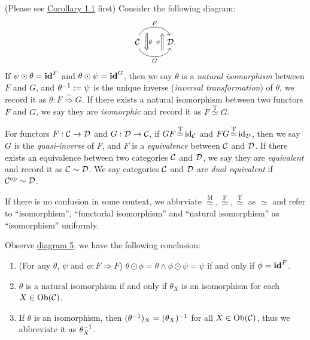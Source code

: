 \documentclass{article}
\begin{document}
\begin{defi}
	(Please see \hyperref[identity transformation]{Corollary 1.1} first) Consider the following diagram:
	\begin{equation}\begin{tikzcd}\label{iso}
		\ca 
		\arrow[r, bend left =75, "F", ""' {name=U1, near start}, ""' {name=U2, near end}]
		\arrow[r, bend right=75, "G"', "" {name=D1, near start}, ""  {name=D2, near end}]
		& \D.
		\arrow[Rightarrow, "\theta", from=U1, to=D1]
		\arrow[Rightarrow, "\psi"  , from=D2, to=U2]
    \end{tikzcd}\end{equation}
	If $\psi\odot\theta=\mathbf{id}^F$ and $\theta\odot\psi=\mathbf{id}^G$, then we say $\theta$ is a \emph{natural isomorphism} between $F$ and $G$, and $\theta^{-1}:=\psi$ is the unique inverse (\emph{inversal transformation}) of $\theta$, we record it as $\theta:F\mathop{\Rightarrow}\limits^{\sim}G$. If there exists a natural isomorphism between two functors $F$ and $G$, we say they are \emph{isomorphic} and record it as $F\mathop{\simeq}\limits^\mathrm{T}G$.
	
	For functors $F:\mathcal{C}\to\mathcal{D}$ and $G:\mathcal{D}\to\mathcal{C}$, if $GF\mathop{\simeq}\limits^\mathrm{T}\mathrm{id}_{\mathcal{C}}$ and $FG\mathop{\simeq}\limits^\mathrm{T}\mathrm{id}_{\mathcal{D}}$, then we say $G$ is the \emph{quasi-inverse} of $F$, and $F$ is a \emph{equivalence} between $\mathcal{C}$ and $\mathcal{D}$. If there exists an equivalence between two categories $\mathcal{C}$ and $\mathcal{D}$, we say they are \emph{equivalent} and record it as $\mathcal{C}\sim\mathcal{D}$. We say categories $\mathcal{C}$ and $\mathcal{D}$ are \emph{dual equivalent} if $\mathcal{C}^\mathrm{op}\sim\mathcal{D}$.
	
	If there is no confusion in some context, we abbrviate $\mathop{\simeq}\limits^\mathrm{M},\mathop{\simeq}\limits^\mathrm{F},\mathop{\simeq}\limits^\mathrm{T}$ as $\simeq$ and refer to ``isomorphism'', ``functorial isomorphism'' and ``natural isomorphism'' as ``isomorphism'' uniformly.
\end{defi}


\begin{cor}\label{identity transformation}
	Observe \hyperref[iso]{diagram 5}, we have the following conclusion:
	\begin{enumerate}
		\item (For any $\theta$, $\psi$ and $\phi:F\Rightarrow F$) $\theta\odot\phi=\theta\wedge\phi\odot\psi=\psi$ if and only if $\phi=\mathbf{id}^F$.
		\item $\theta$ is a natural isomorphism if and only if $\theta_X$ is an isomorphism for each $X\in\mathrm{Ob}(\mathcal{C})$.
		\item If $\theta$ is an isomorphism, then $(\theta^{-1})_X=(\theta_X)^{-1}$ for all $X\in\mathrm{Ob}(\mathcal{C})$, thus we abbreviate it as $\theta^{-1}_X$.
	\end{enumerate}
\end{cor}
\end{document}
